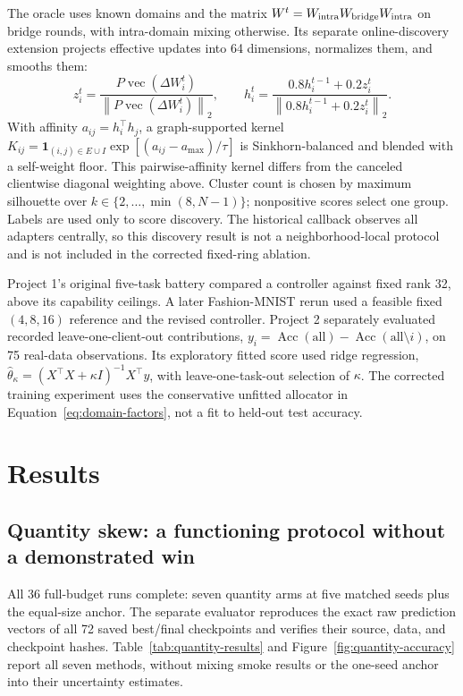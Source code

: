 \documentclass[11pt]{article}
\newcommand{\dW}{\Delta W}
\newcommand{\norm}[1]{\left\lVert#1\right\rVert}
\newcommand{\Acc}{\operatorname{Acc}}
\begin{document}
The oracle uses known domains and the matrix $W^t=W_{\rm intra}W_{\rm bridge}W_{\rm intra}$ on bridge rounds, with intra-domain mixing otherwise. Its separate online-discovery extension projects effective updates into 64 dimensions, normalizes them, and smooths them:
\begin{equation}
 z_i^t=\frac{P\operatorname{vec}(\dW_i^t)}{\norm{P\operatorname{vec}(\dW_i^t)}_2},\qquad
 h_i^t=\frac{0.8h_i^{t-1}+0.2z_i^t}{\norm{0.8h_i^{t-1}+0.2z_i^t}_2}.
\end{equation}
With affinity $a_{ij}=h_i^\top h_j$, a graph-supported kernel $K_{ij}=\mathbf1_{(i,j)\in E\cup I}\exp[(a_{ij}-a_{\max})/\tau]$ is Sinkhorn-balanced and blended with a self-weight floor. This pairwise-affinity kernel differs from the canceled clientwise diagonal weighting above. Cluster count is chosen by maximum silhouette over $k\in\{2,\ldots,\min(8,N-1)\}$; nonpositive scores select one group. Labels are used only to score discovery. The historical callback observes all adapters centrally, so this discovery result is not a neighborhood-local protocol and is not included in the corrected fixed-ring ablation.

Project 1's original five-task battery compared a controller against fixed rank 32, above its capability ceilings. A later Fashion-MNIST rerun used a feasible fixed $(4,8,16)$ reference and the revised controller. Project 2 separately evaluated recorded leave-one-client-out contributions, $y_i=\Acc(\mathrm{all})-\Acc(\mathrm{all}\setminus i)$, on 75 real-data observations. Its exploratory fitted score used ridge regression, $\widehat\theta_\kappa=(X^\top X+\kappa I)^{-1}X^\top y$, with leave-one-task-out selection of $\kappa$. The corrected training experiment uses the conservative unfitted allocator in Equation~\eqref{eq:domain-factors}, not a fit to held-out test accuracy.

\section{Results}
\subsection{Quantity skew: a functioning protocol without a demonstrated win}
\label{sec:quantity-results}
All 36 full-budget runs complete: seven quantity arms at five matched seeds plus the equal-size anchor. The separate evaluator reproduces the exact raw prediction vectors of all 72 saved best/final checkpoints and verifies their source, data, and checkpoint hashes. Table~\ref{tab:quantity-results} and Figure~\ref{fig:quantity-accuracy} report all seven methods, without mixing smoke results or the one-seed anchor into their uncertainty estimates.
\end{document}
